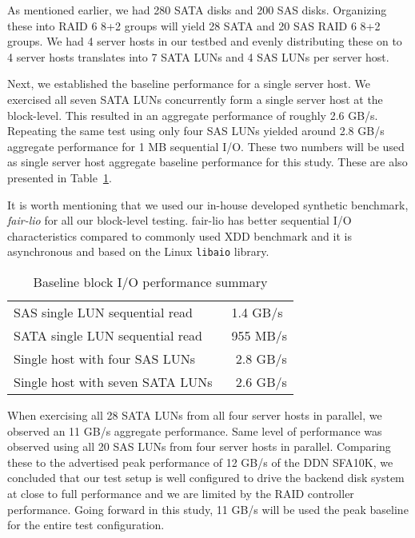 As mentioned earlier, we had 280 SATA disks and 200 SAS disks. Organizing these
into RAID 6 8+2 groups will yield 28 SATA and 20 SAS RAID 6 8+2 groups. We had
4 server hosts in our testbed and evenly distributing these on to 4 server
hosts translates into 7 SATA LUNs and 4 SAS LUNs per server host. 

Next, we established the baseline performance for a single server host. We
exercised all seven SATA LUNs concurrently form a single server host at the
block-level. This resulted in an aggregate performance of roughly 2.6 GB/s.
Repeating the same test using only four SAS LUNs yielded around 2.8 GB/s
aggregate performance for 1 MB sequential I/O. These two numbers will be used
as single server host aggregate baseline performance for this study. These are
also presented in Table~\ref{tbl:block-io-baseline}. 

It is worth mentioning that we used our in-house developed synthetic benchmark,
\textit{fair-lio} for all our block-level testing.  fair-lio has better
sequential I/O characteristics compared to commonly used XDD benchmark and it
is asynchronous and based on the Linux \verb!libaio! library.


\begin{table}[htb]
\centering
\caption{Baseline block I/O performance summary}
\label{tbl:block-io-baseline}

\begin{tabular}{ l | l }
    \hline
    SAS single LUN sequential read & ~1.4 GB/s \\
    SATA single LUN sequential read & ~955 MB/s \\
    Single host with four SAS LUNs & ~ 2.8 GB/s \\
    Single host with seven SATA LUNs & ~ 2.6 GB/s \\
    \hline
\end{tabular}
\end{table}

When exercising all 28 SATA LUNs from all four server hosts in parallel, we
observed an 11 GB/s aggregate performance. Same level of performance was
observed using all 20 SAS LUNs from four server hosts in parallel. Comparing
these to the advertised peak performance of 12 GB/s of the DDN SFA10K, we
concluded that our test setup is well configured to drive the backend disk
system at close to full performance and we are limited by the RAID controller
performance. Going forward in this study, 11 GB/s will be used the peak
baseline for the entire test configuration.


